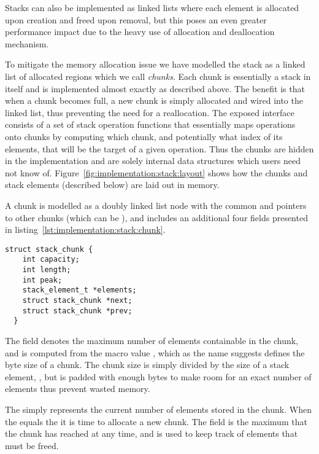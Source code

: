 \begin{remark}
  Stacks can also be implemented as linked lists where each element is
  allocated upon creation and freed upon removal, but this poses an
  even greater performance impact due to the heavy use of allocation
  and deallocation mechanism.
\end{remark}

To mitigate the memory allocation issue we have modelled the stack as
a linked list of allocated regions which we call \textit{chunks}. Each
chunk is essentially a stack in itself and is implemented almost
exactly as described above. The benefit is that when a chunk becomes
full, a new chunk is simply allocated and wired into the linked list,
thus preventing the need for a reallocation. The exposed interface
consists of a set of stack operation functions that essentially maps
operations onto chunks by computing which chunk, and potentially what
index of its elements, that will be the target of a given
operation. Thus the chunks are hidden in the implementation and are
solely internal data structures which users need not know
of. Figure~\ref{fig:implementation:stack:layout} shows how the chunks
and stack elements (described below) are laid out in memory.

A chunk is modelled as a doubly linked list node with the common
 and  pointers to other chunks (which can be
), and includes an additional four fields presented in
listing~\ref{lst:implementation:stack:chunk}.

\begin{lstlisting}[language={[ANSI]C},%
  caption={Structure defining a chunk of the stack},%
  label={lst:implementation:stack:chunk}]
  struct stack_chunk {
    int capacity;
    int length;
    int peak;
    stack_element_t *elements;
    struct stack_chunk *next;
    struct stack_chunk *prev;
  }
\end{lstlisting}

The  field denotes the maximum number of elements
containable in the chunk, and is computed from the macro value
, which as the name suggests defines the byte
size of a chunk. The chunk size is simply divided by the size of a
stack element, , but is padded with enough
bytes to make room for an exact number of elements thus prevent wasted
memory.

The  simply represents the current number of elements
stored in the chunk. When the  equals the 
it is time to allocate a new chunk. The  field is the
maximum  that the chunk has reached at any time, and is
used to keep track of elements that must be freed.

